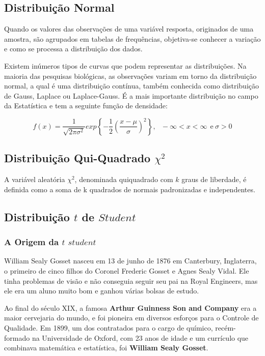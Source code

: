 \newpage
\subsection{Distribuição Normal}

\inic Quando os valores das observações de uma variável resposta, originados de uma amostra, são agrupados em tabelas de frequências, objetiva-se conhecer a variação e como se processa a distribuição dos dados.\vskip0.3cm 

\inic Existem inúmeros tipos de curvas que podem representar as distribuições. Na maioria das pesquisas biológicas, as observações variam em torno da distribuição normal, a qual é uma distribuição contínua, também conhecida como distribuição de Gauss, Laplace ou Laplace-Gauss. É a mais importante distribuição no campo da Estatística e tem a seguinte função de densidade:


\begin{equation}
f\left(x\right) = \frac{1}{\sqrt{2\pi \sigma^2}}exp \left\{-\frac{1}{2}\left(\frac{x-\mu}{\sigma}\right)^2 \right\},~~~-\infty<x<\infty~~\text{e}~\sigma>0 
 \end{equation}



\newpage
\subsection{Distribuição Qui-Quadrado $\chi^{2}$}

\inic A variável aleatória $\chi^{2}$, denominada quiquadrado com $k$ graus de liberdade, é definida como a soma de k quadrados de normais padronizadas e independentes. 


\newpage
\subsection{Distribuição $t$ de $Student$}
\subsubsection{A Origem da $t$ $student$}

William Sealy Gosset nasceu em 13 de junho de 1876 em Canterbury, Inglaterra, o primeiro de cinco filhos do Coronel Frederic Gosset e Agnes Sealy Vidal. Ele tinha problemas de visão e não conseguia seguir seu pai na Royal Engineers, mas ele era um aluno muito bom e ganhou várias bolsas de estudo.\vskip0.3cm


Ao final do século XIX, a famosa \textbf{Arthur Guinness Son and Company} era a maior cervejaria do mundo, e foi pioneira em diversos esforços para o Controle de Qualidade. Em 1899, um dos contratados para o cargo de químico, recém-formado na Universidade de Oxford, com 23 anos de idade e um currículo que combinava matemática e estatística, foi \textbf{William Sealy Gosset}.\vskip0.3cm

